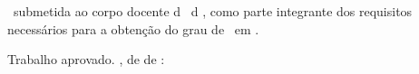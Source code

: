 

% 

\begin{folhadeaprovacao}
    \ABNTEXchapterfont%
    \center%

    {%
        \large\ValorDoNomeCompletoDoAutor{}
    }
    \vspace*{\fill}

    {%
        \Large
        \textbf{\MakeUppercase{\ValorDoTitulo{}}}%
        \par
        \ifDefinidoSubtitulo%
            \ValorDoSubtitulo{}%
            \par
        \fi
    }
    \vspace*{\fill}

    \hspace{.45\textwidth}
    \begin{minipage}{.5\textwidth}
        \ValorDoTipo{}\ submetida ao corpo docente d\ValorDoArtigoGramaticalDaUnidadeAcademica{} \ValorDoNomeDaUnidadeAcademica{}\ d\ValorDoArtigoGramaticalDaInstituicao{} \ValorDoNomeDaInstituicao{}, como
        parte integrante dos requisitos necess\'arios para a obten\c{c}\~ao do grau de \titlecap{\ValorDoGrau{}}\ em \ValorDoCurso{}.
    \end{minipage}%
    \vspace*{\fill}

    {%
        Trabalho aprovado. \ValorDaCidade{}, \ValorDoDia{} de \ValorDoMes{} de \ValorDoAno{}:
    }

    \begin{multicols}{2}
        \setlength{\ABNTEXsignwidth}{7cm}%


        \ifDefinidoCoorientador%
        \fi


\end{multicols}
\end{folhadeaprovacao}
